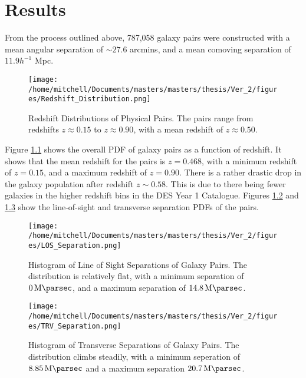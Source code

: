 
\chapter{Results}

From the process outlined above, 787,058 galaxy pairs were constructed with a mean angular separation of $\sim 27.6 $ arcmins, and a mean comoving separation of $11.9 h^{-1}$ Mpc. 

\begin{figure}[H]
\centering
\texttt{[image: /home/mitchell/Documents/masters/masters/thesis/Ver\_2/figures/Redshift\_Distribution.png]}
\caption{Redshift Distributions of Physical Pairs. The pairs range from redshifts $z\approx0.15$ to $z\approx0.90$, with a mean redshift of $z\approx0.50$.}
\label{fig:physical:redshifts}
\end{figure}

Figure \ref{fig:physical:redshifts} shows the overall PDF of galaxy pairs as a function of redshift. It shows that the mean redshift for the pairs is $z=0.468$, with a minimum redshift of $z= 0.15$, and a maximum redshift of $z= 0.90$. There is a rather drastic drop in the galaxy population after redshift $z \sim 0.58$. This is due to there being fewer galaxies in the higher redshift bins in the DES Year 1 Catalogue. Figures \ref{fig:physical:lineofsight} and \ref{fig:physical:transverse} show the line-of-sight and transverse separation PDFs of the pairs.

\begin{figure}[h!]
\centering
\texttt{[image: /home/mitchell/Documents/masters/masters/thesis/Ver\_2/figures/LOS\_Separation.png]}
\caption{Histogram of Line of Sight Separations of Galaxy Pairs. The distribution is relatively flat, with a minimum separation of $\SI{0}{\mega\parsec}$, and a maximum separation of $\SI{14.8}{\mega\parsec}$.}
\label{fig:physical:lineofsight}
\end{figure}


\begin{figure}[h!]
\centering
\texttt{[image: /home/mitchell/Documents/masters/masters/thesis/Ver\_2/figures/TRV\_Separation.png]}
\caption{Histogram of Transverse Separations of Galaxy Pairs. The distribution climbs steadily, with a minimum seperation of $\SI{8.85}{\mega\parsec}$ and a maximum separation $\SI{20.7}{\mega\parsec}$. }
\label{fig:physical:transverse}
\end{figure}


